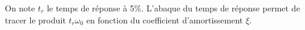 \documentclass[10pt,fleqn]{article} %
\begin{document}
%
%
%
%
%
%
%
%
%


On note $t_r$  le temps de réponse à 5\%. L'abaque du temps de réponse permet de tracer le produit $t_r\omega_0$ en fonction du coefficient d'amortissement $\xi$.
\end{document}
